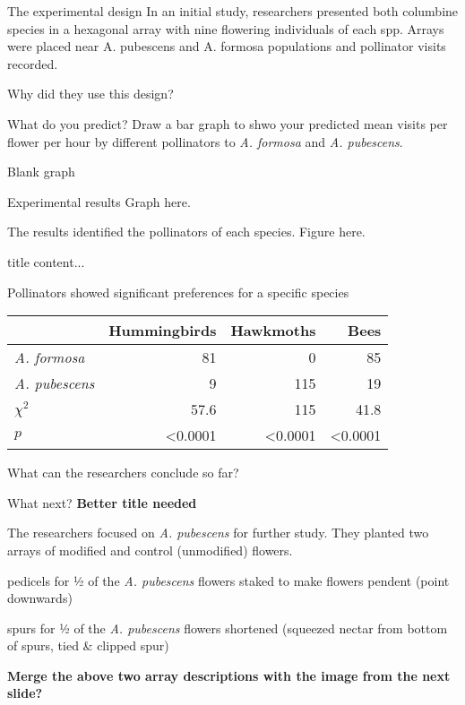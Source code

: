 \documentclass[t]{beamer}
\begin{document}
%
\begin{frame}[t]{The experimental design}
	\hangpara In an initial study, researchers presented both columbine species in a hexagonal array with nine flowering individuals of each spp. Arrays were placed near A. pubescens and A. formosa populations and pollinator visits recorded.
	
	\hangpara Why did they use this design?
\end{frame}
%
\begin{frame}[t]{What do you predict?}
	\hangpara Draw a bar graph to shwo your predicted mean visits per flower per hour by different pollinators to \textit{A. formosa} and \textit{A. pubescens}.
	
	\hangpara Blank graph
\end{frame}
%
\begin{frame}[t]{Experimental results}
	Graph here.
\end{frame}
%
\begin{frame}[t]{The results identified the pollinators of each species.}
	Figure here.
\end{frame}
%
\begin{frame}[t]{title}
	content...
\end{frame}
%
\begin{frame}[t]{Pollinators showed significant preferences for a specific species}
		
	\begin{center}
	\begin{tabular}{lrrr}
	\toprule
		 	& Hummingbirds & Hawkmoths & Bees \tabularnewline
	\midrule
	\textit{A. formosa}		&	81	&	0	&	85 \tabularnewline
	\textit{A. pubescens}	&	9	&	115	&	19 \tabularnewline
	$\chi^2$				&	57.6	&	115	&	41.8 \tabularnewline
	$p$						&  \textless0.0001 & \textless0.0001 & \textless0.0001 \tabularnewline
	\bottomrule
	\end{tabular}
	\end{center}

	\hangpara What can the researchers conclude so far?
\end{frame}
%
\begin{frame}[t]{What next? \textbf{Better title needed}}
	
	\hangpara The researchers focused on \textit{A. pubescens} for further study. They planted two arrays of modified and control (unmodified) flowers.

	\hangpara {} pedicels for ½ of the \textit{A. pubescens} flowers staked to make flowers pendent (point downwards)
	
	\hangpara {} spurs for ½ of the \textit{A. pubescens} flowers shortened (squeezed nectar from bottom of spurs, tied \& clipped spur)
	
	\textbf{Merge the above two array descriptions with the image from the next slide?}

\end{frame}
\end{document}
